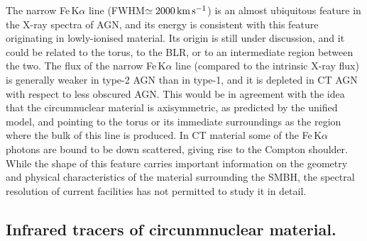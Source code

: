\documentclass{natureprintstyle}
\begin{document}
The narrow Fe\,K$\alpha$ line (FWHM$\simeq 2000\rm\,km\,s^{-1}$)\cite{Shu:2010tg} is an almost ubiquitous feature in the X-ray spectra of AGN\cite{Nandra:1994ly}, and its energy is consistent with this feature originating in lowly-ionised material\cite{Shu:2010tg}. Its origin is still under discussion, and it could be related to the torus\cite{Shu:2010tg}, to the BLR\cite{Bianchi:2008sf}, or to an intermediate region between the two\cite{Gandhi:2015zp}. {The flux of the narrow Fe\,K$\alpha$ line (compared to the intrinsic X-ray flux) is generally weaker in type-2 AGN than in type-1, and it is depleted in CT AGN with respect to less obscured AGN\cite{Ricci:2014ek}.} This would be in agreement with the idea that the circumnuclear material is axisymmetric, as predicted by the unified model, and pointing to the torus or its immediate surroundings as the region where the bulk of this line is produced. In CT material some of the Fe\,K$\alpha$ photons are bound to be down scattered, giving rise to the Compton shoulder. While the shape of this feature carries important information on the geometry and physical characteristics of the material surrounding the SMBH\cite{Matt:2002eu}, the spectral resolution of current facilities has not permitted to study it in detail.





\subsection*{Infrared tracers of circunmnuclear material.}
\end{document}
